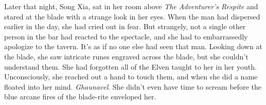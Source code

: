 \documentclass[12pt]{article}
\begin{document}
Later that night, Song Xia, sat in her room above {\em The Adventurer's Respite}
and stared at the blade with a strange look in her eyes. When the man had
dispersed earlier in the day, she had cried out in fear. But strangely, not
a single other person in the bar had reacted to the spectacle, and she had to
embarrassedly apologize to the tavern. It's as if no one else had seen that man.
Looking down at the blade, she saw intricate runes engraved across the blade,
but she couldn't understand them. She had forgotten all of the Elven taught to
her in her youth. Unconsciously, she reached out a hand to touch them, and when
she did a name floated into her mind. {\em Ghaunavel}. She didn't even have time
to scream before the blue arcane fires of the blade-rite enveloped her.
\end{document}
